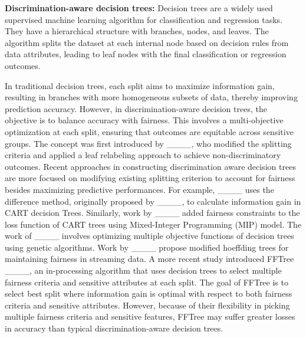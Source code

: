 \textbf{Discrimination-aware decision trees:} Decision trees are a widely used supervised machine learning algorithm for classification and regression tasks. They have a hierarchical structure with branches, nodes, and leaves. The algorithm splits the dataset at each internal node based on decision rules from data attributes, leading to leaf nodes with the final classification or regression outcomes.

In traditional decision trees, each split aims to maximize information gain, resulting in branches with more homogeneous subsets of data, thereby improving prediction accuracy. However, in discrimination-aware decision trees, the objective is to balance accuracy with fairness. This involves a multi-objective optimization at each split, ensuring that outcomes are equitable across sensitive groups. The concept was first introduced by ____, who modified the splitting criteria and applied a leaf relabeling approach to achieve non-discriminatory outcomes.
Recent approaches in constructing discrimination aware decision trees are more focused on modifying existing splitting criterion to account for fairness besides maximizing predictive performances. For example, ____ uses the difference method, originally proposed by ____, to calculate information gain in CART decision Trees. Similarly, work by ____ added fairness constraints to the loss function of CART trees using Mixed-Integer Programming (MIP) model. The work of ____ involves optimizing multiple objective functions of decision trees using genetic algorithms. Work by ____ propose modified hoeffding trees for maintaining fairness in streaming data. A more recent study introduced FFTree ____, an in-processing algorithm that uses decision trees to select multiple fairness criteria and sensitive attributes at each split. The goal of FFTree is to select best split where information gain is optimal with respect to both fairness criteria and sensitive attributes. However, because of their flexibility in picking multiple fairness criteria and sensitive features, FFTree may suffer greater losses in accuracy than typical discrimination-aware decision trees.  

